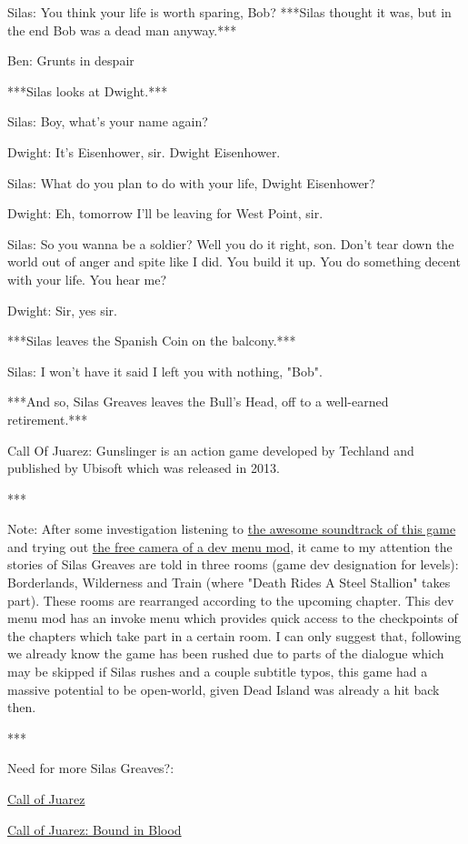 \documentclass{article}
\begin{document}
Silas: You think your life is worth sparing, Bob? ***Silas thought it was, but in the end Bob was a dead man anyway.***

Ben: {Grunts in despair}

***Silas looks at Dwight.***

Silas: Boy, what's your name again?

Dwight: It's Eisenhower, sir. Dwight Eisenhower.

Silas: What do you plan to do with your life, Dwight Eisenhower?

Dwight: Eh, tomorrow I'll be leaving for West Point, sir.

Silas: So you wanna be a soldier? Well you do it right, son. Don't tear down the world out of anger and spite like I did. You build it up. You do something decent with your life. You hear me?

Dwight: Sir, yes sir.

***Silas leaves the Spanish Coin on the balcony.***

Silas: I won't have it said I left you with nothing, "Bob".

***And so, Silas Greaves leaves the Bull's Head, off to a well-earned retirement.***

Call Of Juarez: Gunslinger is an action game developed by Techland and published by Ubisoft which was released in 2013.

***

Note: After some investigation listening to \href{https://www.youtube.com/playlist?list=PL6NsvPsFxD9bRzacDEDLdyhoWxGPFiW2T}{the awesome soundtrack of this game} and trying out \href{https://www.gamepressure.com/download.asp?ID=74332}{the free camera of a dev menu mod}, it came to my attention the stories of Silas Greaves are told in three rooms (game dev designation for levels): Borderlands, Wilderness and Train (where "Death Rides A Steel Stallion" takes part). These rooms are rearranged according to the upcoming chapter. This dev menu mod has an invoke menu which provides quick access to the checkpoints of the chapters which take part in a certain room. I can only suggest that, following we already know the game has been rushed due to parts of the dialogue which may be skipped if Silas rushes and a couple subtitle typos, this game had a massive potential to be open-world, given Dead Island was already a hit back then.

***

Need for more Silas Greaves?:

\href{https://store.steampowered.com/app/3020/?curator_clanid=4777282&utm_source=SteamDB}{Call of Juarez}

\href{https://store.steampowered.com/app/21980/?curator_clanid=4777282&utm_source=SteamDB}{Call of Juarez: Bound in Blood}
\end{document}
